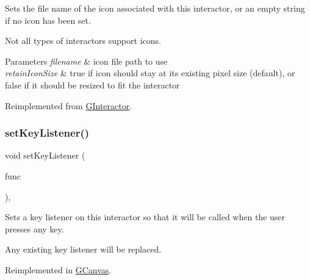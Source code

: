 Sets the file name of the icon associated with this interactor, or an empty string if no icon has been set. 

Not all types of interactors support icons. 
\begin{DoxyParams}{Parameters}
{\em filename} & icon file path to use \\
\hline
{\em retain\+Icon\+Size} & true if icon should stay at its existing pixel size (default), or false if it should be resized to fit the interactor \\
\hline
\end{DoxyParams}


Reimplemented from \mbox{\hyperlink{classsgl_1_1GInteractor_a762e139aa311461c3984d3ad28293f64}{G\+Interactor}}.

\mbox{\label{classsgl_1_1GInteractor_aeb8324d3287fa1fbe093f4d6230cf0a6}} 
\subsubsection{\texorpdfstring{set\+Key\+Listener()}{setKeyListener()}\hspace{0.1cm}{\footnotesize\ttfamily [1/2]}}
{\footnotesize\ttfamily void set\+Key\+Listener (\begin{DoxyParamCaption}\item[{\mbox{\hyperlink{namespacesgl_ae9f3e9eab70035da1a2b114e21357b25}{G\+Event\+Listener}}}]{func }\end{DoxyParamCaption})\hspace{0.3cm}{\ttfamily [virtual]}, {\ttfamily [inherited]}}



Sets a key listener on this interactor so that it will be called when the user presses any key. 

Any existing key listener will be replaced. 

Reimplemented in \mbox{\hyperlink{classsgl_1_1GCanvas_a53809ec015da5bf9fad5e7a11b218993}{G\+Canvas}}.

\mbox{\label{classsgl_1_1GInteractor_ae48ecea73606c7bd9423e1c7cc589cc9}} 
